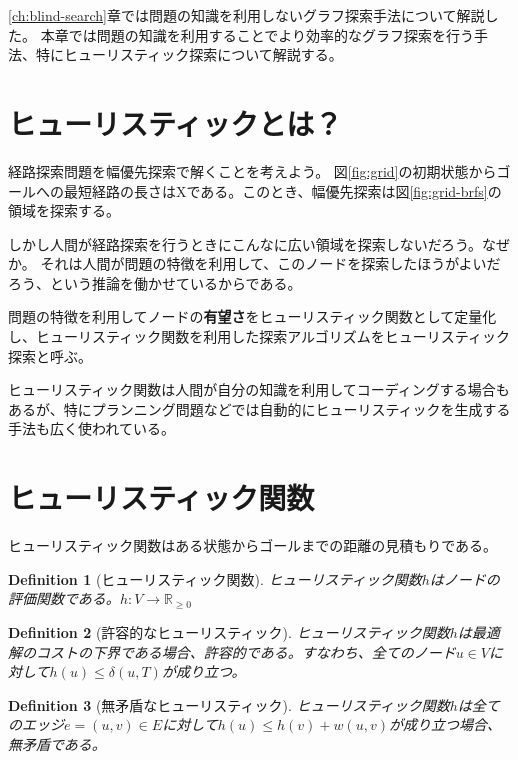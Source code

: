 \documentclass{book}
\newtheorem{definition}{Definition}
\begin{document}
\ref{ch:blind-search}章では問題の知識を利用しないグラフ探索手法について解説した。
本章では問題の知識を利用することでより効率的なグラフ探索を行う手法、特にヒューリスティック探索について解説する。

\section{ヒューリスティックとは？}
\label{sec:heursitic}

経路探索問題を幅優先探索で解くことを考えよう。
図\ref{fig:grid}の初期状態からゴールへの最短経路の長さはXである。このとき、幅優先探索は図\ref{fig:grid-brfs}の領域を探索する。

しかし人間が経路探索を行うときにこんなに広い領域を探索しないだろう。なぜか。
それは人間が問題の特徴を利用して、このノードを探索したほうがよいだろう、という推論を働かせているからである。

問題の特徴を利用してノードの{\bf 有望さ}をヒューリスティック関数として定量化し、ヒューリスティック関数を利用した探索アルゴリズムをヒューリスティック探索と呼ぶ。

ヒューリスティック関数は人間が自分の知識を利用してコーディングする場合もあるが、特にプランニング問題などでは自動的にヒューリスティックを生成する手法も広く使われている。


\section{ヒューリスティック関数}
\label{sec:heuristic-function}

ヒューリスティック関数はある状態からゴールまでの距離の見積もりである。

\begin{definition}[ヒューリスティック関数]
ヒューリスティック関数$h$はノードの評価関数である。$h: V \rightarrow \mathbb{R}_{\geq 0}$
\end{definition}

\begin{definition}[許容的なヒューリスティック]
ヒューリスティック関数$h$は最適解のコストの下界である場合、許容的である。すなわち、全てのノード$u \in V$に対して$h(u) \leq \delta(u, T)$が成り立つ。
\end{definition}

\begin{definition}[無矛盾なヒューリスティック]
ヒューリスティック関数$h$は全てのエッジ$e = (u, v) \in E$に対して$h(u) \leq h(v) + w(u,v)$が成り立つ場合、無矛盾である。
\end{definition}
\end{document}
